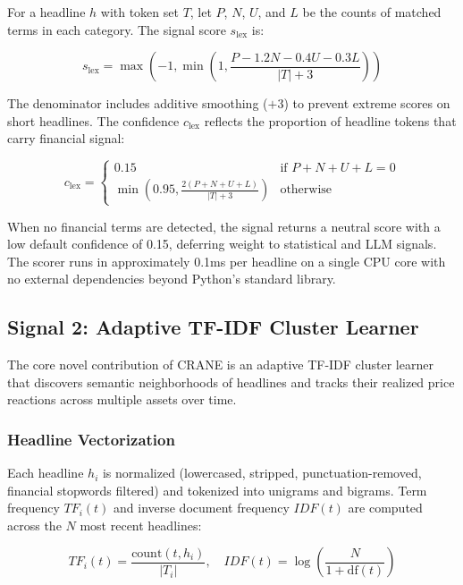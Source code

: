 For a headline $h$ with token set $T$, let $P$, $N$, $U$, and $L$ be the counts of matched terms in each category. The signal score $s_{\text{lex}}$ is:

\begin{equation}
s_{\text{lex}} = \max\left(-1, \min\left(1, \frac{P - 1.2N - 0.4U - 0.3L}{|T| + 3}\right)\right)
\label{eq:lexicon}
\end{equation}

The denominator includes additive smoothing ($+3$) to prevent extreme scores on short headlines. The confidence $c_{\text{lex}}$ reflects the proportion of headline tokens that carry financial signal:

\begin{equation}
c_{\text{lex}} = 
\begin{cases}
0.15 & \text{if } P + N + U + L = 0 \\
\min\left(0.95, \frac{2(P + N + U + L)}{|T| + 3}\right) & \text{otherwise}
\end{cases}
\label{eq:lexicon_conf}
\end{equation}

When no financial terms are detected, the signal returns a neutral score with a low default confidence of 0.15, deferring weight to statistical and LLM signals. The scorer runs in approximately 0.1ms per headline on a single CPU core with no external dependencies beyond Python's standard library.

\subsection{Signal 2: Adaptive TF-IDF Cluster Learner}
\label{sec:cluster}

The core novel contribution of CRANE is an adaptive TF-IDF cluster learner that discovers semantic neighborhoods of headlines and tracks their realized price reactions across multiple assets over time.

\subsubsection{Headline Vectorization}

Each headline $h_i$ is normalized (lowercased, stripped, punctuation-removed, financial stopwords filtered) and tokenized into unigrams and bigrams. Term frequency $TF_i(t)$ and inverse document frequency $IDF(t)$ are computed across the $N$ most recent headlines:

\begin{equation}
TF_i(t) = \frac{\text{count}(t, h_i)}{|T_i|}, \quad
IDF(t) = \log\left(\frac{N}{1 + \text{df}(t)}\right)
\label{eq:tfidf}
\end{equation}

